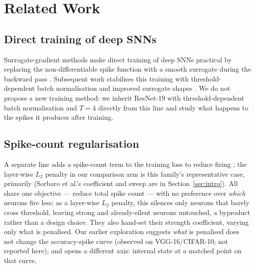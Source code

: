 \section{Related Work}
\label{sec:related}

\subsection{Direct training of deep SNNs}
Surrogate-gradient methods make direct training of deep SNNs practical by
replacing the non-differentiable spike function with a smooth surrogate during
the backward pass \cite{wu2018spatio,neftci2019surrogate,wu2019direct}.
Subsequent work stabilises this training with threshold-dependent batch
normalisation and improved surrogate shapes
\cite{zheng2021going,deng2022temporal,fang2021incorporating}. We do not propose
a new training method: we inherit ResNet-19 with threshold-dependent batch
normalisation and $T{=}4$ directly from this line and study what happens to
the spikes it produces after training.

\subsection{Spike-count regularisation}
A separate line adds a spike-count term to the training loss to reduce firing
\cite{neil2016learning,sorbaro2020optimizing,pellegrini2021low,meda2022improving,sakemi2023sparse};
the layer-wise $L_2$ penalty in our comparison arm is this family's
representative case, primarily
\cite{neil2016learning,sorbaro2020optimizing,pellegrini2021low} (Sorbaro et
al.'s coefficient and sweep are in Section~\ref{sec:intro}). All share one
objective --- reduce total spike count --- with no preference over
\emph{which} neurons fire less; as a layer-wise $L_2$ penalty, this silences
only neurons that barely cross threshold, leaving strong and already-silent
neurons untouched, a byproduct rather than a design choice. They also
hand-set their strength coefficient, varying only what is penalised. Our
earlier exploration suggests \emph{what} is penalised does not change the accuracy-spike
curve (observed on VGG-16/CIFAR-10; not reported here), and opens a different axis: internal state at a matched point on that
curve.

